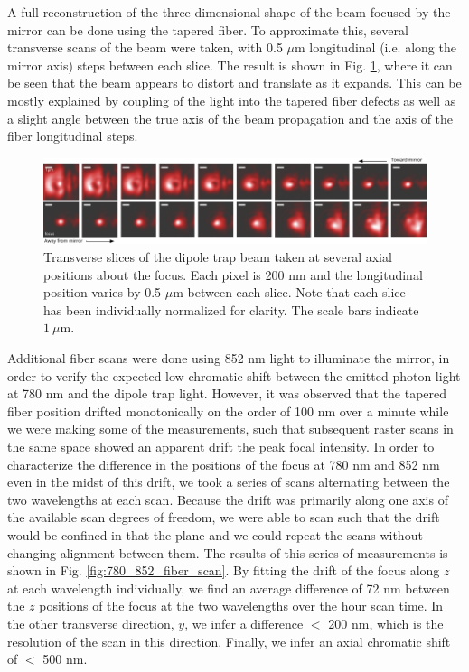 A full reconstruction of the three-dimensional shape of the beam focused by the mirror can be done using the tapered fiber. To approximate this, several transverse scans of the beam were taken, with 0.5 $\mu \mathrm{m}$ longitudinal (i.e. along the mirror axis) steps between each slice. The result is shown in Fig. \ref{fig:fiber_scan_axial_steps}, where it can be seen that the beam appears to distort and translate as it expands. This can be mostly explained by coupling of the light into the tapered fiber defects as well as a slight angle between the true axis of the beam propagation and the axis of the fiber longitudinal steps. 

\begin{figure}
    \centering
    \includegraphics[width=\textwidth]{Images/fiber_scan_tranverse_slices.pdf}
    \caption{Transverse slices of the dipole trap beam taken at several axial positions about the focus. Each pixel is 200 nm and the longitudinal position varies by 0.5 $\mu \mathrm{m}$ between each slice. Note that each slice has been individually normalized for clarity. The scale bars indicate $1~\mu \mathrm{m}$.}
    \label{fig:fiber_scan_axial_steps}
\end{figure}

Additional fiber scans were done using 852 nm light to illuminate the mirror, in order to verify the expected low chromatic shift between the emitted photon light at 780 nm and the dipole trap light. However, it was observed that the tapered fiber position drifted monotonically on the order of 100 nm over a minute while we were making some of the measurements, such that subsequent raster scans in the same space showed an apparent drift the peak focal intensity. In order to characterize the difference in the positions of the focus at 780 nm and 852 nm even in the midst of this drift, we took a series of scans alternating between the two wavelengths at each scan. Because the drift was primarily along one axis of the available scan degrees of freedom, we were able to scan such that the drift would be confined in that the plane and we could repeat the scans without changing alignment between them. The results of this series of measurements is shown in Fig. \ref{fig:780_852_fiber_scan}. By fitting the drift of the focus along $z$ at each wavelength individually, we find an average difference of 72 nm between the $z$ positions of the focus at the two wavelengths over the hour scan time. In the other transverse direction, $y$, we infer a difference $<$ 200 nm, which is the resolution of the scan in this direction. Finally, we infer an axial chromatic shift of $<$ 500 nm.  

